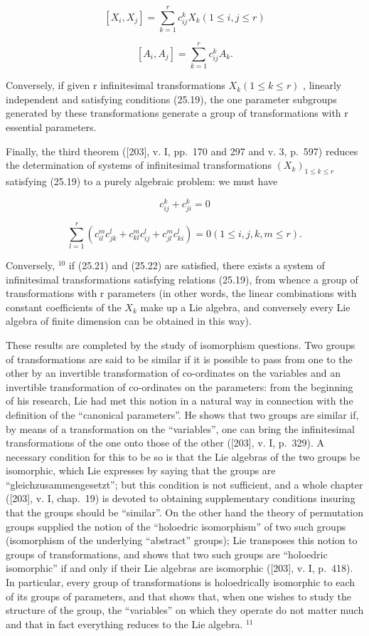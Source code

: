 \[
[ X _ {i}, X _ {j} ] = \sum_ {k = 1} ^ {r} c _ {i j} ^ {k} X _ {k} (1 \leq i, j \leq r)\tag{25.19}
\]

\[
\left[ A _ {i}, A _ {j} \right] = \sum_ {k = 1} ^ {r} c _ {i j} ^ {k} A _ {k}.\tag{25.20}
\]

Conversely, if given r infinitesimal transformations \(X_{k}(1 \leq k \leq r)\) , linearly independent and satisfying conditions (25.19), the one parameter subgroups generated by these transformations generate a group of transformations with r essential parameters.

Finally, the third theorem ({[}203{]}, v. I, pp.~170 and 297 and v. 3, p.~597) reduces the determination of systems of infinitesimal transformations \((X_{k})_{1\leq k\leq r}\) satisfying (25.19) to a purely algebraic problem: we must have

\[
c _ {i j} ^ {k} + c _ {j i} ^ {k} = 0\tag{25.21}
\]

\[
\sum_ {l = 1} ^ {r} (c _ {i l} ^ {m} c _ {j k} ^ {l} + c _ {k l} ^ {m} c _ {i j} ^ {l} + c _ {j l} ^ {m} c _ {k i} ^ {l}) = 0 (1 \leq i, j, k, m \leq r).\tag{25.22}
\]

Conversely, \(^{10}\) if (25.21) and (25.22) are satisfied, there exists a system of infinitesimal transformations satisfying relations (25.19), from whence a group of transformations with r parameters (in other words, the linear combinations with constant coefficients of the \(X_{k}\) make up a Lie algebra, and conversely every Lie algebra of finite dimension can be obtained in this way).

These results are completed by the study of isomorphism questions. Two groups of transformations are said to be similar if it is possible to pass from one to the other by an invertible transformation of co-ordinates on the variables and an invertible transformation of co-ordinates on the parameters: from the beginning of his research, Lie had met this notion in a natural way in connection with the definition of the ``canonical parameters''. He shows that two groups are similar if, by means of a transformation on the ``variables'', one can bring the infinitesimal transformations of the one onto those of the other ({[}203{]}, v. I, p.~329). A necessary condition for this to be so is that the Lie algebras of the two groups be isomorphic, which Lie expresses by saying that the groups are ``gleichzusammengesetzt''; but this condition is not sufficient, and a whole chapter ({[}203{]}, v. I, chap.~19) is devoted to obtaining supplementary conditions insuring that the groups should be ``similar''. On the other hand the theory of permutation groups supplied the notion of the ``holoedric isomorphism'' of two such groups (isomorphism of the underlying ``abstract'' groups); Lie transposes this notion to groups of transformations, and shows that two such groups are ``holoedric isomorphic'' if and only if their Lie algebras are isomorphic ({[}203{]}, v. I, p.~418). In particular, every group of transformations is holoedrically isomorphic to each of its groups of parameters, and that shows that, when one wishes to study the structure of the group, the ``variables'' on which they operate do not matter much and that in fact everything reduces to the Lie algebra. \(^{11}\)

